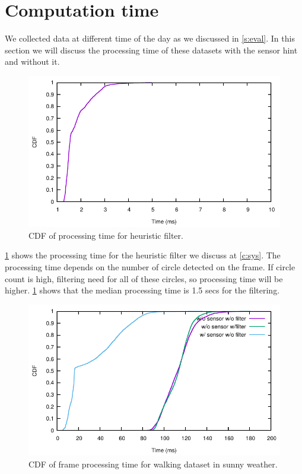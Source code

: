 \section{Computation time}
We collected data at different time of the day as we discussed in \ref{s:eval}.
In this section we will discuss the processing time of these datasets with the sensor hint and without it.

\begin{figure}[h!]
\centering
\includegraphics[width=5.2in]{plots/sunny_cdf_filter.pdf}
\caption{CDF of processing time for heuristic filter.}
\label{f:cdf_fil}
\end{figure}

\ref{f:cdf_fil} shows the processing time for the heuristic filter we discuss at \ref{c:sys}.
The processing time depends on the number of circle detected on the frame.
If circle count is high, filtering need for all of these circles, so processing time will be higher.
\ref{f:cdf_fil} shows that the median processing time is 1.5 secs for the filtering. 

\begin{figure}[h!]
\centering
\includegraphics[width=5.2in]{plots/sunny_cdf_time.pdf}
\caption{CDF of frame processing time for walking dataset in sunny weather.}
\label{f:cdf_sunny}
\end{figure}


